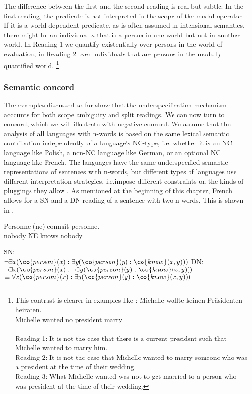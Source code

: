 \documentclass[output=paper]{langsci/langscibook}
\begin{document}
The difference between the first and the second reading is real but subtle: In the first reading, the predicate  is not interpreted in the scope of the modal operator. If it is a world-dependent predicate, as is often assumed in intensional semantics, there might be an individual $a$ that is a person in one world but not in another world. In Reading 1 we quantify existentially over persons in the world of evaluation, in Reading 2 over individuals that are persons in the modally quantified world.%
\footnote{This contrast is clearer in examples like :
\ea \label{modal-not}
\gll Michelle wollte keinen Präsidenten heiraten.\\
Michelle wanted no president marry\\
\glt {}\\
Reading 1: It is not the case that there is a current president such that Michelle wanted to marry him.\\
Reading 2: It is not the case that Michelle wanted to marry someone who was a president at the time of their wedding.\\
Reading 3: What Michelle wanted was not to get married to a person who was president at the time of their wedding.
\z}

\subsubsection{Semantic concord}
\label{Sec-LRS-NC}

The examples discussed so far show that the underspecification mechanism accounts for both scope ambiguity and split readings. 
We can now turn to concord, which we will illustrate with negative concord.
We assume that the analysis of all languages with n-words is based on 
the same lexical semantic contribution independently of a language's NC-type, i.e. whether it is an NC language like Polish, a non-NC language like German, or an optional NC language like French.
The languages have the same underspecified semantic representations of sentences with n-words, but different types of languages use different interpretation strategies, i.e.\@ impose different constraints on the kinds of pluggings they allow \citep{Richter:Sailer:06}. As mentioned at the beginning of this chapter, French allows for a SN and a DN reading of a sentence with two n-words. This is shown in .

\ea \label{personne-personne}
\gll Personne (ne) connaît personne.\\
nobody NE knows nobody\\
\begin{xlist}
\ex 
\glt SN: \\
$\lnot \exists x (\co{person}(x) : \exists y (\co{person}(y) : \co{know}(x,y)))$%
\ex 
\glt DN: \\
$\lnot \exists x (\co{person}(x) : \lnot \exists y (\co{person}(y) : \co{know}(x,y)))$\\
$\equiv \forall x (\co{person}(x) : \exists y (\co{person}(y): \co{know}(x,y)))$
\end{xlist}
\z 
\end{document}
